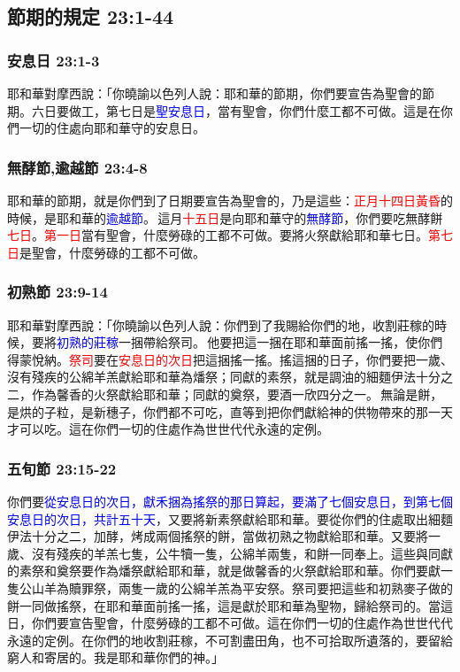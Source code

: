 \subsection{節期的規定 23:1-44}




\subsubsection{安息日 23:1-3}
耶和華對摩西說：「你曉諭以色列人說：耶和華的節期，你們要宣告為聖會的節期。六日要做工，第七日是\textcolor{blue}{聖安息日}，當有聖會，你們什麼工都不可做。這是在你們一切的住處向耶和華守的安息日。

\subsubsection{無酵節,逾越節 23:4-8}
耶和華的節期，就是你們到了日期要宣告為聖會的，乃是這些：\textcolor{red}{正月十四日黃昏}的時候，是耶和華的\textcolor{blue}{逾越節}。 這月\textcolor{red}{十五日}是向耶和華守的\textcolor{blue}{無酵節}，你們要吃無酵餅\textcolor{red}{七日}。\textcolor{red}{第一日}當有聖會，什麼勞碌的工都不可做。要將火祭獻給耶和華七日。\textcolor{red}{第七日}是聖會，什麼勞碌的工都不可做。

\subsubsection{初熟節 23:9-14}
耶和華對摩西說：「你曉諭以色列人說：你們到了我賜給你們的地，收割莊稼的時候，要將\textcolor{blue}{初熟的莊稼}一捆帶給祭司。 他要把這一捆在耶和華面前搖一搖，使你們得蒙悅納。\textcolor{red}{祭司}要在\textcolor{red}{安息日的次日}把這捆搖一搖。搖這捆的日子，你們要把一歲、沒有殘疾的公綿羊羔獻給耶和華為燔祭；同獻的素祭，就是調油的細麵伊法十分之二，作為馨香的火祭獻給耶和華；同獻的奠祭，要酒一欣四分之一。 無論是餅，是烘的子粒，是新穗子，你們都不可吃，直等到把你們獻給神的供物帶來的那一天才可以吃。這在你們一切的住處作為世世代代永遠的定例。

\subsubsection{五旬節 23:15-22}
你們要\textcolor{blue}{從安息日的次日，獻禾捆為搖祭的那日算起，要滿了七個安息日，到第七個安息日的次日，共計五十天}，又要將新素祭獻給耶和華。要從你們的住處取出細麵伊法十分之二，加酵，烤成兩個搖祭的餅，當做初熟之物獻給耶和華。又要將一歲、沒有殘疾的羊羔七隻，公牛犢一隻，公綿羊兩隻，和餅一同奉上。這些與同獻的素祭和奠祭要作為燔祭獻給耶和華，就是做馨香的火祭獻給耶和華。你們要獻一隻公山羊為贖罪祭，兩隻一歲的公綿羊羔為平安祭。祭司要把這些和初熟麥子做的餅一同做搖祭，在耶和華面前搖一搖，這是獻於耶和華為聖物，歸給祭司的。當這日，你們要宣告聖會，什麼勞碌的工都不可做。這在你們一切的住處作為世世代代永遠的定例。在你們的地收割莊稼，不可割盡田角，也不可拾取所遺落的，要留給窮人和寄居的。我是耶和華你們的神。」


